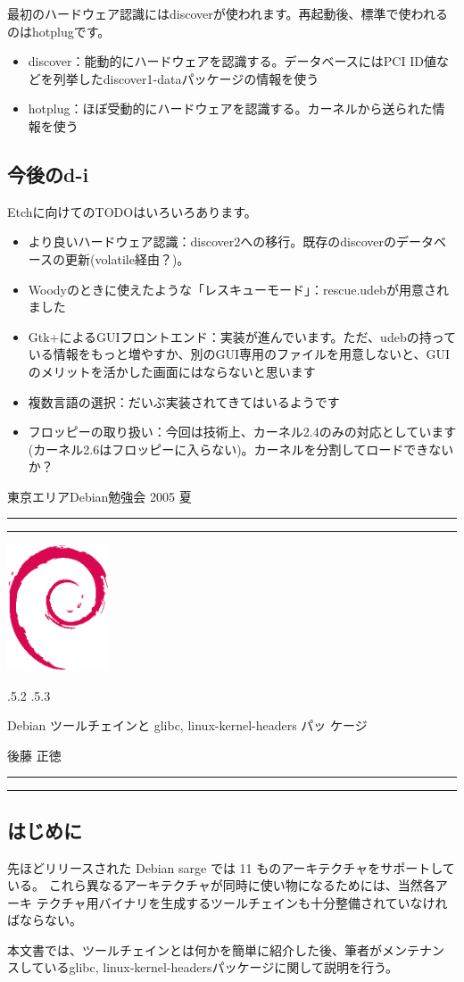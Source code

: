\documentclass[mingoth,a4paper]{jsarticle}
\makeatletter
\renewcommand{\section}{\@startsection{section}{1}{\z@}%
    {\Cvs \@plus.5\Cdp \@minus.2\Cdp}%
    {.5\Cvs \@plus.3\Cdp}%
    {\normalfont\Large\headfont\raggedright\centering}} %
\newcommand{\dancersection}[2]{%
\newpage
東京エリアDebian勉強会 2005 夏
\hrule
\vspace{0.5mm}
\hrule
\hfill{}\includegraphics[width=3cm]{image200502/openlogo-nd.eps}\\
\vspace{-4cm}
\begin{center}
  \section{#1}
\end{center}
\hfill{}#2\hspace{3cm}\space\\
\hrule
\hrule
\vspace{1cm}
}
\makeatother
\begin{document}
最初のハードウェア認識にはdiscoverが使われます。再起動後、標準で使われるのはhotplugです。

\begin{itemize}
\item discover：能動的にハードウェアを認識する。データベースにはPCI ID値などを列挙したdiscover1-dataパッケージの情報を使う
\item hotplug：ほぼ受動的にハードウェアを認識する。カーネルから送られた情報を使う
\end{itemize}


\subsection{今後のd-i}
\label{sec:di}

Etchに向けてのTODOはいろいろあります。

\begin{itemize}
\item より良いハードウェア認識：discover2への移行。既存のdiscoverのデータベースの更新(volatile経由？)。
\item Woodyのときに使えたような「レスキューモード」：rescue.udebが用意されました
\item Gtk+によるGUIフロントエンド：実装が進んでいます。ただ、udebの持っている情報をもっと増やすか、別のGUI専用のファイルを用意しないと、GUIのメリットを活かした画面にはならないと思います
\item 複数言語の選択：だいぶ実装されてきてはいるようです
\item フロッピーの取り扱い：今回は技術上、カーネル2.4のみの対応としています(カーネル2.6はフロッピーに入らない)。カーネルを分割してロードできないか？
\end{itemize}


\dancersection{Debian ツールチェインと glibc, linux-kernel-headers パッ
ケージ}{後藤 正徳}
\label{sec:gotom}

\subsection{はじめに}

   先ほどリリースされた Debian sarge では 11 ものアーキテクチャをサポートしている。
   これら異なるアーキテクチャが同時に使い物になるためには、当然各アーキ
   テクチャ用バイナリを生成するツールチェインも十分整備されていなけれ
   ばならない。

   本文書では、ツールチェインとは何かを簡単に紹介した後、筆者がメンテナン
   スしているglibc, linux-kernel-headersパッケージに関して説明を行う。
\end{document}
